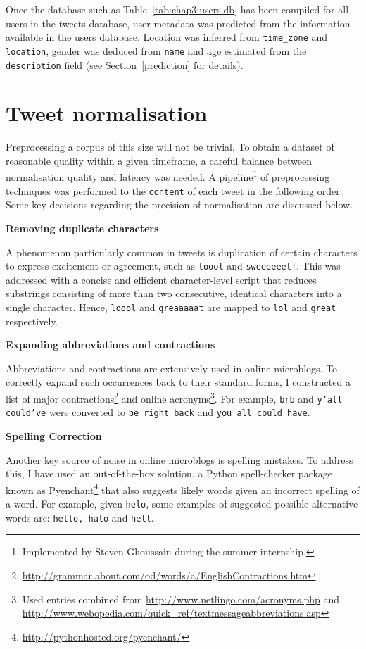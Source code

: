\documentclass[a4paper,12pt,twoside,openright]{report}
\newcommand{\tb}{\vspace{10pt} \textbf}
\newcommand{\tx}{\texttt}
\begin{document}
\noindent Once the database such as Table~\ref{tab:chap3:users.db} has been compiled for all users in the tweets database, user metadata was predicted from the information available in the users database. Location was inferred from \tx{time\_zone} and \tx{location}, gender was deduced from \tx{name} and age estimated from the \tx{description} field (see Section~\ref{prediction} for details).

\section{Tweet normalisation}

Preprocessing a corpus of this size will not be trivial. To obtain a dataset of reasonable quality within a given timeframe, a careful balance between normalisation quality and latency was needed. A pipeline\footnote{Implemented by Steven Ghoussain during the summer internship.} of preprocessing techniques was performed to the \tx{content} of each tweet in the following order. Some key decisions regarding the precision of normalisation are discussed below.

\tb{Removing duplicate characters}

A phenomenon particularly common in tweets is duplication of certain characters to express excitement or agreement, such as \tx{loool} and \tx{sweeeeeet!}. This was addressed with a concise and efficient character-level script that reduces substrings consisting of more than two consecutive, identical characters into a single character. Hence, \tx{loool} and \tx{greaaaaat} are mapped to \tx{lol} and \tx{great} respectively. 

\tb{Expanding abbreviations and contractions}

Abbreviations and contractions are extensively used in online microblogs. To correctly expand such occurrences back to their standard forms, I constructed a list of major contractions\footnote{\url{http://grammar.about.com/od/words/a/EnglishContractions.htm}} and online acronyms\footnote{Used entries combined from \url{http://www.netlingo.com/acronyms.php} and \url{http://www.webopedia.com/quick_ref/textmessageabbreviations.asp}}. For example, \tx{brb} and \tx{y'all could've} were converted to \tx{be right back} and \tx{you all could have}.

\tb{Spelling Correction}

Another key source of noise in online microblogs is spelling mistakes. To address this, I have used an out-of-the-box solution, a Python spell-checker package known as Pyenchant\footnote{\url{http://pythonhosted.org/pyenchant/}} that also suggests likely words given an incorrect spelling of a word. For example, given \tx{helo}, some examples of suggested possible alternative words are: \tx{hello, halo} and \tx{hell}. 
\end{document}
